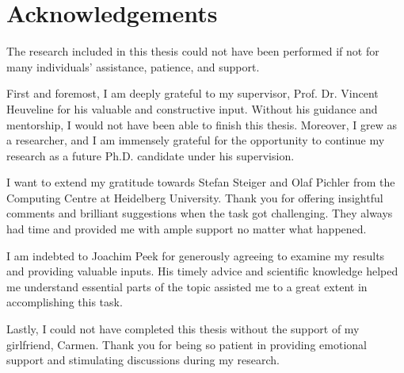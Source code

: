 \chapter*{Acknowledgements}
\thispagestyle{empty}


The research included in this thesis could not have been performed if not for many individuals' assistance, patience, and support. 
 
First and foremost, I am deeply grateful to my supervisor, Prof. Dr. Vincent Heuveline for his valuable and constructive input.
Without his guidance and mentorship,
I would not have been able to finish this thesis.
Moreover, I grew as a researcher, and I am immensely grateful for the opportunity to continue my research as a future Ph.D. candidate under his supervision. 

I want to extend my gratitude towards Stefan Steiger and Olaf Pichler from the Computing Centre at Heidelberg University.
Thank you for offering insightful comments and brilliant suggestions when the task got challenging.
They always had time and provided me with ample support no matter what happened.

I am indebted to Joachim Peek for generously agreeing to examine my results and providing valuable inputs.
His timely advice and scientific knowledge helped me understand essential parts of the topic assisted me to a great extent in accomplishing this task.

Lastly, I could not have completed this thesis without the support of my girlfriend, Carmen.
Thank you for being so patient in providing emotional support and stimulating discussions during my research.